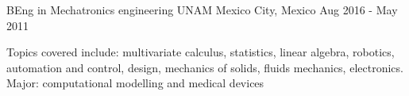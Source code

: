 \begin{cventries}
{\begin{cvitems}
\end{cvitems}
}

\cventry
{BEng in Mechatronics engineering}%
{UNAM} %
{Mexico City, Mexico} %
{Aug 2016 - May 2011} %
{ %
\begin{cvitems}
\item[] {Topics covered include: multivariate calculus, statistics, linear algebra, robotics, automation and control, design, mechanics of solids, fluids mechanics,
electronics. Major: computational modelling and medical devices}
\end{cvitems}
}



\end{cventries}